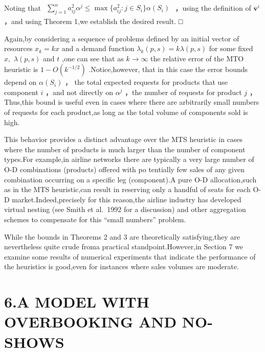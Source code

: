 Noting that
\(\begin{array} { r } { \sum _ { j = 1 } ^ { n } a _ { i j } ^ { 2 } \alpha ^ { j } \leqslant \operatorname* { m a x } \{ a _ { i j } ^ { 2 } \colon j \in S _ { i } \} \alpha ( S _ { i } ) } \end{array}\)
，using the definition of
\(\overline { { \boldsymbol { v } } } ^ { i }\) ，and using Theorem 1,we
establish the desired result. □

Again,by considering a sequence of problems defined by an initial vector
of resources \(x _ { k } = k x\) and a demand function
\(\lambda _ { k } ( p , s ) = k \lambda ( p , s )\) for some fixed
\(x ,\) \(\lambda ( p , s )\) and \(t\) ,one can see that as
\(k \to \infty\) the relative error of the MTO heuristic is
\(1 - O ( k ^ { - 1 / 2 } )\) .Notice,however, that in this case the
error bounds depend on \(\alpha ( S _ { i } )\) ， the total expected
requests for products that use component \(i\) ，and not directly on
\(\alpha ^ { j }\) ，the number of requests for product \(j\)
，Thus,this bound is useful even in cases where there are arbitrarily
small numbers of requests for each product,as long as the total volume
of components sold is high.

This behavior provides a distinct advantage over the MTS heuristic in
cases where the number of products is much larger than the number of
component types.For example,in airline networks there are typically a
very large number of O-D combinations (products) offered with po
tentially few sales of any given combination occurring on a specific leg
(component).A pure O-D allocation,such as in the MTS heuristic,can
result in reserving only a handful of seats for each O-D
market.Indeed,precisely for this reason,the airline industry has
developed virtual nesting (see Smith et al.~1992 for a discussion) and
other aggregation schemes to compensate for this ``small numbers''
problem.

While the bounds in Theorems 2 and 3 are theoretically satisfying,they
are nevertheless quite crude froma practical standpoint.However,in
Section 7 we examine some results of numerical experiments that indicate
the performance of the heuristics is good,even for instances where sales
volumes are moderate.

\section{6.A MODEL WITH OVERBOOKING AND
NO-SHOWS}\label{a-model-with-overbooking-and-no-shows}


